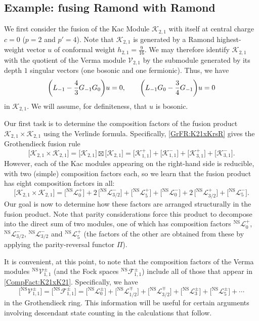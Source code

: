 \documentclass[a4paper,reqno,12pt]{report}
\theoremstyle{definition}
\numberwithin{equation}{section}
\let\originalleft\left     %
\let\originalright\right
\renewcommand{\left}{\mathopen{}\mathclose\bgroup\originalleft}
\renewcommand{\right}{\aftergroup\egroup\originalright}
\newcommand{\brac}[1]{\left( #1 \right)}
\newcommand{\Ver}[1]{\mathcal{V}_{#1}}       %
\newcommand{\Irr}[1]{\mathcal{L}_{#1}}       %
\newcommand{\Kac}[1]{\mathcal{K}_{#1}}       %
\newcommand{\Fock}[1]{\mathcal{F}_{#1}}      %
\newcommand{\Gr}[1]{\bigl[ #1 \bigr]}            %
\newcommand{\fuse}{\mathbin{\times}}                                            %
\newcommand{\Grfuse}{\mathbin{\boxtimes}}                                       %
\newcommand{\hw}{highest-weight}
\newcommand{\svs}{singular vectors}
\newcommand{\rhs}{right-hand side}
\theoremstyle{plain}
\newcommand{\hwv}{\hw{} vector}
\newcommand{\NSVer}[1]{{}^{\text{NS}}\Ver{#1}}     %
\newcommand{\NSIrr}[1]{{}^{\text{NS}}\Irr{#1}}     %
\newcommand{\NSFock}[1]{{}^{\text{NS}}\Fock{#1}}   %
\begin{document}
\subsection{Example:  fusing Ramond with Ramond} \label{sec:FusRR}

We first consider the fusion of the Kac Module $\Kac{2,1}$ with itself at central charge $c=0$ ($p=2$ and $p'=4$).  Note that $\Kac{2,1}$ is generated by a Ramond \hwv{} $u$ of conformal weight $h_{2,1} = \tfrac{9}{16}$.  We may therefore identify $\Kac{2,1}$ with the quotient of the Verma module $\Ver{2,1}$ by the submodule generated by its depth $1$ \svs{} (one bosonic and one fermionic).  Thus, we have
\begin{equation} \label{SV:K21}
\brac{L_{-1} - \frac{4}{3}G_{-1}G_{0}} u = 0, \qquad \brac{L_{-1}G_0 - \frac{3}{4}G_{-1}} u = 0
\end{equation}
in $\Kac{2,1}$.  We will assume, for definiteness, that $u$ is bosonic.

Our first task is to determine the composition factors of the fusion product $\Kac{2,1} \fuse \Kac{2,1}$ using the Verlinde formula.  Specifically, \eqref{GrFR:K21xKrsR} gives the Grothendieck fusion rule
\begin{equation}
\Gr{\Kac{2,1} \fuse \Kac{2,1}} = \Gr{\Kac{2,1}} \Grfuse \Gr{\Kac{2,1}} = \Gr{\Kac{1,1}^+} + \Gr{\Kac{1,1}^-} + \Gr{\Kac{3,1}^+} + \Gr{\Kac{3,1}^-}.
\end{equation}
However, each of the Kac modules appearing on the \rhs{} is reducible, with two (simple) composition factors each, so we learn that the fusion product has eight composition factors in all:
\begin{equation} \label{CompFact:K21xK21}
\Gr{\Kac{2,1} \fuse \Kac{2,1}} = \Gr{\NSIrr{0}^+} + 2 \, \Gr{\NSIrr{3/2}^-} + \Gr{\NSIrr{5}^+} + \Gr{\NSIrr{0}^-} + 2 \, \Gr{\NSIrr{3/2}^+} + \Gr{\NSIrr{5}^-}.
\end{equation}
Our goal is now to determine how these factors are arranged structurally in the fusion product.  Note that parity considerations force this product to decompose into the direct sum of two modules, one of which has composition factors $\NSIrr{0}^+$, $\NSIrr{3/2}^-$, $\NSIrr{3/2}^-$ and $\NSIrr{5}^+$ (the factors of the other are obtained from these by applying the parity-reversal functor $\Pi$).

It is convenient, at this point, to note that the composition factors of the Verma modules $\NSVer{1,1}^{\pm}$ (and the Fock spaces $\NSFock{1,1}^{\pm}$) include all of those that appear in \eqref{CompFact:K21xK21}.  Specifically, we have
\begin{equation}
\Gr{\NSVer{1,1}^{\pm}} = \Gr{\NSFock{1,1}^{\pm}} = \Gr{\NSIrr{0}^{\pm}} + \Gr{\NSIrr{1/2}^{\mp}} + \Gr{\NSIrr{3/2}^{\mp}} + \Gr{\NSIrr{3}^{\pm}} + \Gr{\NSIrr{5}^{\pm}} + \cdots
\end{equation}
in the Grothendieck ring.  This information will be useful for certain arguments involving descendant state counting in the calculations that follow.
\end{document}

